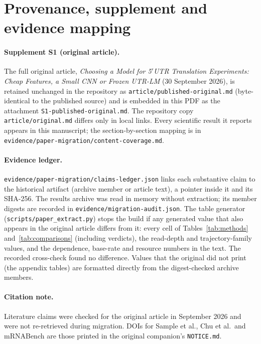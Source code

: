 \documentclass[11pt]{article}
\newcommand{\m}[1]{\texttt{#1}}
\begin{document}
\section{Provenance, supplement and evidence mapping}\label{app:provenance}
\paragraph{Supplement S1 (original article).} The full original article, \emph{Choosing a Model for 5$'$UTR Translation
Experiments: Cheap Features, a Small CNN or Frozen UTR-LM} (30 September 2026), is retained unchanged in the repository
as \m{article/published-original.md} (byte-identical to the published source) and is embedded in this PDF as the
attachment \m{S1-published-original.md}. The repository copy \m{article/original.md} differs only in local links. Every
scientific result it reports appears in this manuscript; the section-by-section mapping is in
\m{evidence/paper-migration/content-coverage.md}.

\paragraph{Evidence ledger.} \m{evidence/paper-migration/claims-ledger.json} links each substantive claim to the
historical artifact (archive member or article text), a pointer inside it and its SHA-256. The results archive was read
in memory without extraction; its member digests are recorded in \m{evidence/migration-audit.json}. The table generator
(\m{scripts/paper\_extract.py}) stops the build if any generated value that also appears in the original article
differs from it: every cell of Tables~\ref{tab:methods} and~\ref{tab:comparisons} (including verdicts), the read-depth
and trajectory-family values, and the dependence, base-rate and resource numbers in the text. The recorded cross-check
found no difference. Values that the original did not print (the appendix tables) are formatted directly from the
digest-checked archive members.

\paragraph{Citation note.} Literature claims were checked for the original article in September 2026 and were not
re-retrieved during migration. DOIs for Sample et al., Chu et al.\ and mRNABench are those printed in the original
companion's \m{NOTICE.md}.
\end{document}
